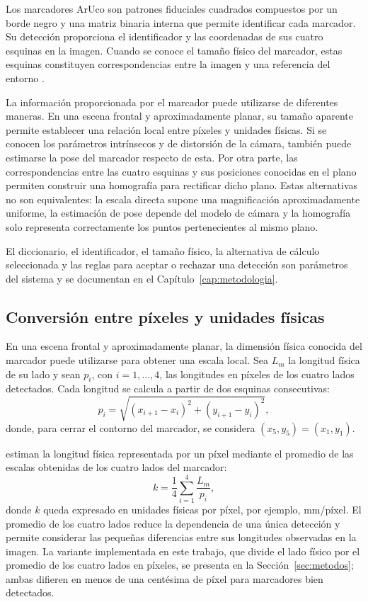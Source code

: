 \documentclass{report}
\begin{document}
Los marcadores ArUco son patrones fiduciales cuadrados compuestos por un borde negro y una matriz binaria interna que permite identificar cada marcador. Su detección proporciona el identificador y las coordenadas de sus cuatro esquinas en la imagen. Cuando se conoce el tamaño físico del marcador, estas esquinas constituyen correspondencias entre la imagen y una referencia del entorno \parencite{GarridoJurado2014}.

La información proporcionada por el marcador puede utilizarse de diferentes maneras. En una escena frontal y aproximadamente planar, su tamaño aparente permite establecer una relación local entre píxeles y unidades físicas. Si se conocen los parámetros intrínsecos y de distorsión de la cámara, también puede estimarse la pose del marcador respecto de esta. Por otra parte, las correspondencias entre las cuatro esquinas y sus posiciones conocidas en el plano permiten construir una homografía para rectificar dicho plano. Estas alternativas no son equivalentes: la escala directa supone una magnificación aproximadamente uniforme, la estimación de pose depende del modelo de cámara y la homografía solo representa correctamente los puntos pertenecientes al mismo plano.

El diccionario, el identificador, el tamaño físico, la alternativa de cálculo seleccionada y las reglas para aceptar o rechazar una detección son parámetros del sistema y se documentan en el Capítulo~\ref{cap:metodologia}.

\subsection{Conversión entre píxeles y unidades físicas}

En una escena frontal y aproximadamente planar, la dimensión física conocida del marcador puede utilizarse para obtener una escala local. Sea $L_m$ la longitud física de su lado y sean $p_i$, con $i = 1, \ldots, 4$, las longitudes en píxeles de los cuatro lados detectados. Cada longitud se calcula a partir de dos esquinas consecutivas:
\begin{equation}
p_i = \sqrt{(x_{i+1} - x_i)^2 + (y_{i+1} - y_i)^2},
\label{eq:lado}
\end{equation}
donde, para cerrar el contorno del marcador, se considera $(x_5, y_5) = (x_1, y_1)$.

\textcite{Monkman2019} estiman la longitud física representada por un píxel mediante el promedio de las escalas obtenidas de los cuatro lados del marcador:
\begin{equation}
k = \frac{1}{4}\sum_{i=1}^{4}\frac{L_m}{p_i},
\label{eq:escala-monkman}
\end{equation}
donde $k$ queda expresado en unidades físicas por píxel, por ejemplo, mm/píxel. El promedio de los cuatro lados reduce la dependencia de una única detección y permite considerar las pequeñas diferencias entre sus longitudes observadas en la imagen. La variante implementada en este trabajo, que divide el lado físico por el promedio de los cuatro lados en píxeles, se presenta en la Sección~\ref{sec:metodos}; ambas difieren en menos de una centésima de píxel para marcadores bien detectados.
\end{document}
